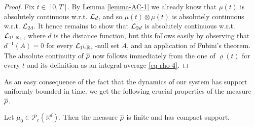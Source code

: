 \begin{proof}
	Fix $t\in [0,T]$. By Lemma \ref{lemma-AC-1} we already know that $\mu(t)$ is absolutely continuous w.r.t.
	$\mathcal{L}_d$, and so $\mu(t)\otimes\mu(t)$ is absolutely continuous w.r.t. $\mathcal{L}_{2d}$. It hence
	remains to show that $\mathcal{L}_{2d}$ is absolutely continuous w.r.t. $\mathcal{L}_1\llcorner_{\mathbb{R}_+}$, where $d$ is the distance function,
	but this follows easily by observing that $d^{-1}(A)=0$ for every $\mathcal{L}_1\llcorner_{\mathbb{R}_+}$-null set $A$, and an application of Fubini's theorem.	
	The absolute continuity of $\overline\rho$ now follows immediately from the one of $\varrho(t)$ for every $t$ and its
	definition as an integral average \eqref{eq-rho-4}.
\end{proof}

As an easy consequence of the fact that the dynamics of our system has support uniformly bounded in time, we get the following crucial properties of the measure $\overline\rho$.

\begin{lemma}\label{rhocompact} Let $\mu_0 \in \mathcal P_c(\mathbb R^d)$. Then
	the measure $\overline\rho$ is finite and has compact support.
\end{lemma}

